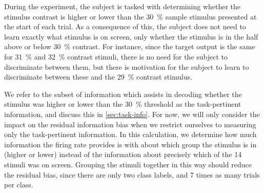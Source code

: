 During the experiment, the subject is tasked with determining whether the stimulus contrast is higher or lower than the \SI{30}{\percent} sample stimulus presented at the start of each trial.
As a consequence of this, the subject does not need to learn exactly what stimulus is on screen, only whether the stimulus is in the half above or below \SI{30}{\percent} contrast.
For instance, since the target output is the same for \SI{31}{\percent} and \SI{32}{\percent} contrast stimuli, there is no need for the subject to discriminate between them, but there is motivation for the subject to learn to discriminate between these and the \SI{29}{\percent} contrast stimulus.

We refer to the subset of information which assists in decoding whether the stimulus was higher or lower than the \SI{30}{\percent} threshold as the task-pertinent information, and discuss this in \autoref{sec:task-info}.
For now, we will only consider the impact on the residual information bias when we restrict ourselves to measuring only the task-pertinent information.
In this calculation, we determine how much information the firing rate provides is with about which group the stimulus is in (higher or lower) instead of the information about precisely which of the \num{14} stimuli was on screen.
Grouping the stimuli together in this way should reduce the residual bias, since there are only two class labels, and \num{7} times as many trials per class.


